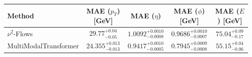     \begin{tabular}{lcccc}
        \toprule
        Method & MAE ($p_T$) [GeV] & MAE ($\eta$) & MAE ($\phi$) [GeV] & MAE ($E$) [GeV] \\
        \midrule
        $\nu^2$-Flows & $29.77^{+0.04}_{-0.05}$ & $1.0092^{+0.0010}_{-0.0008}$ & $0.9686^{+0.0010}_{-0.0007}$ & $75.04^{+0.09}_{-0.17}$ \\
        MultiModalTransformer & $24.355^{+0.013}_{-0.013}$ & $0.9417^{+0.0010}_{-0.0005}$ & $0.7945^{+0.0009}_{-0.0008}$ & $55.15^{+0.04}_{-0.06}$ \\
        \bottomrule
    \end{tabular}